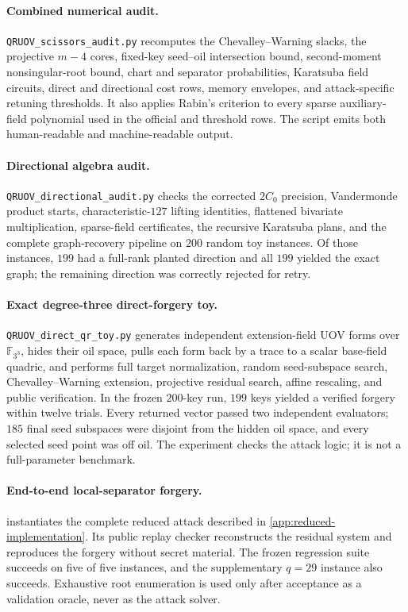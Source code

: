 \documentclass[11pt,a4paper]{article}
\theoremstyle{definition}
\theoremstyle{remark}
\newcommand{\F}{\mathbb F}
\begin{document}
\paragraph{Combined numerical audit.}
\texttt{QRUOV\_scissors\_audit.py} recomputes the Chevalley--Warning slacks,
the projective $m-4$ cores, fixed-key seed--oil intersection bound,
second-moment nonsingular-root bound, chart and separator probabilities,
Karatsuba field circuits, direct and directional cost rows, memory envelopes,
and attack-specific retuning thresholds.  It also applies Rabin's criterion to
every sparse auxiliary-field polynomial used in the official and threshold
rows.  The script emits both human-readable and machine-readable output.

\paragraph{Directional algebra audit.}
\texttt{QRUOV\_directional\_audit.py} checks the corrected $2C_0$ precision,
Vandermonde product starts, characteristic-$127$ lifting identities, flattened
bivariate multiplication, sparse-field certificates, the recursive Karatsuba
plans, and the complete graph-recovery pipeline on $200$ random toy instances.  Of those instances, $199$ had a full-rank planted direction and all $199$ yielded the exact graph; the remaining direction was correctly rejected for retry.

\paragraph{Exact degree-three direct-forgery toy.}
\texttt{QRUOV\_direct\_qr\_toy.py} generates independent extension-field UOV
forms over $\F_{3^3}$, hides their oil space, pulls each form back by a trace to
a scalar base-field quadric, and performs full target normalization, random
seed-subspace search, Chevalley--Warning extension, projective residual search,
affine rescaling, and public verification.  In the frozen $200$-key run, $199$ keys yielded a verified forgery within twelve trials.  Every returned vector passed two independent evaluators; $185$ final seed subspaces were disjoint from the hidden oil space, and every selected seed point was off oil.  The experiment checks the attack logic; it is not a full-parameter benchmark.

\paragraph{End-to-end local-separator forgery.}
 instantiates the
complete reduced attack described in \cref{app:reduced-implementation}.  Its public
replay checker reconstructs the residual system and reproduces the forgery
without secret material.  The frozen regression suite succeeds on five of five
instances, and the supplementary $q=29$ instance also succeeds.  Exhaustive
root enumeration is used only after acceptance as a validation oracle, never as
the attack solver.
\end{document}
